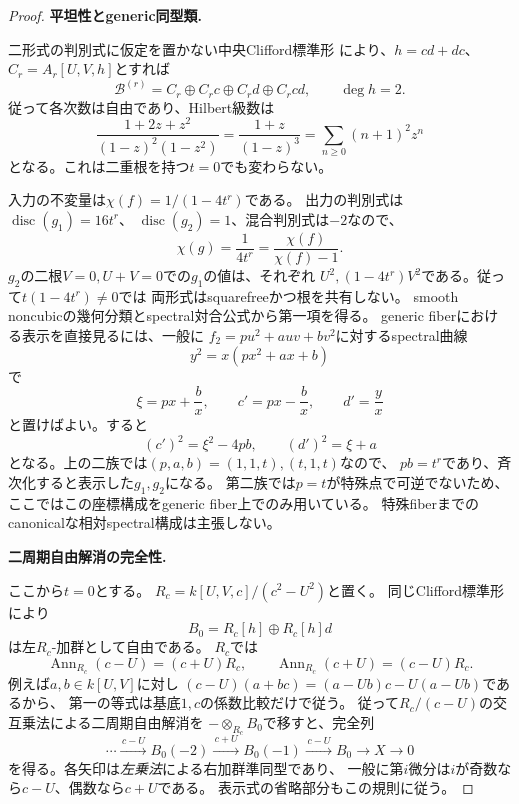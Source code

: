 \begin{proof}
\par\medskip\noindent\textbf{平坦性とgeneric同型類.}\par\nobreak\smallskip
二形式の判別式に仮定を置かない中央Clifford標準形
\cite[\texttt{lem:noncubic-relative-clifford-center}]{QuadricModuli2026}
により、$h=cd+dc$、$C_r=A_r[U,V,h]$とすれば
\[
 \mathcal B^{(r)}=C_r\oplus C_rc\oplus C_rd\oplus C_rcd,
 \qquad \deg h=2.
\]
従って各次数は自由であり、Hilbert級数は
\[
 \frac{1+2z+z^2}{(1-z)^2(1-z^2)}
 =\frac{1+z}{(1-z)^3}
 =\sum_{n\ge0}(n+1)^2z^n
\]
となる。これは二重根を持つ$t=0$でも変わらない。

入力の不変量は$\chi(f)=1/(1-4t^r)$である。
出力の判別式は$\operatorname{disc}(g_1)=16t^r$、
$\operatorname{disc}(g_2)=1$、混合判別式は$-2$なので、
\[
 \chi(g)=\frac1{4t^r}
 =\frac{\chi(f)}{\chi(f)-1}.
\]
$g_2$の二根$V=0,U+V=0$での$g_1$の値は、それぞれ
$U^2,(1-4t^r)V^2$である。従って$t(1-4t^r)\ne0$では
両形式はsquarefreeかつ根を共有しない。
smooth noncubicの幾何分類とspectral対合公式から第一項を得る。
generic fiberにおける表示を直接見るには、一般に
$f_2=pu^2+auv+bv^2$に対するspectral曲線
\[
 y^2=x(px^2+ax+b)
\]
で
\[
 \xi=px+\frac b x,\qquad
 c'=px-\frac b x,\qquad d'=\frac y x
\]
と置けばよい。すると
\[
 (c')^2=\xi^2-4pb,\qquad (d')^2=\xi+a
\]
となる。上の二族では$(p,a,b)=(1,1,t),(t,1,t)$なので、
$pb=t^r$であり、斉次化すると表示した$g_1,g_2$になる。
第二族では$p=t$が特殊点で可逆でないため、
ここではこの座標構成をgeneric fiber上でのみ用いている。
特殊fiberまでのcanonicalな相対spectral構成は主張しない。

\par\medskip\noindent\textbf{二周期自由解消の完全性.}\par\nobreak\smallskip
ここから$t=0$とする。
$R_c=k[U,V,c]/(c^2-U^2)$と置く。
同じClifford標準形により
\[
 B_0=R_c[h]\oplus R_c[h]d
\]
は左$R_c$-加群として自由である。
$R_c$では
\[
 \operatorname{Ann}_{R_c}(c-U)=(c+U)R_c,
 \qquad
 \operatorname{Ann}_{R_c}(c+U)=(c-U)R_c.
\]
例えば$a,b\in k[U,V]$に対し
$(c-U)(a+bc)=(a-Ub)c-U(a-Ub)$であるから、
第一の等式は基底$1,c$の係数比較だけで従う。
従って$R_c/(c-U)$の交互乗法による二周期自由解消を
$-\otimes_{R_c}B_0$で移すと、完全列
\begin{equation}
 \cdots\xrightarrow{\,c-U\,} B_0(-2)
 \xrightarrow{\,c+U\,}B_0(-1)
 \xrightarrow{\,c-U\,}B_0
 \longrightarrow X\longrightarrow0
 \label{eq:qa-spectral-boundary-periodic-resolution}
\end{equation}
を得る。各矢印は\emph{左乗法}による右加群準同型であり、
一般に第$i$微分は$i$が奇数なら$c-U$、偶数なら$c+U$である。
表示式の省略部分もこの規則に従う。


\end{proof}

